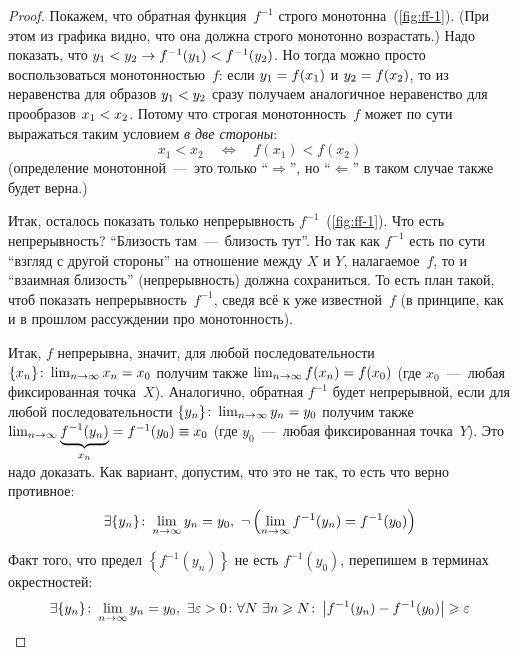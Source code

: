 \documentclass[a4paper,12pt]{article}
\begin{document}
\begin{proof}
    Покажем, что обратная функция~$f^{-1}$ строго монотонна~(\ref{fig:ff-1}).
    (При этом из графика видно, что она должна строго монотонно возрастать.)
    Надо показать, что $y_1 \hm< y_2 \hm\to f^{-1}(y_1) \hm< f^{-1}(y_2)$.
    Но тогда можно просто воспользоваться монотонностью~$f$: если $y_1 \hm= f(x_1)$ и $y_2 \hm= f(x_2)$, то из неравенства для образов $y_1 \hm< y_2$ сразу получаем аналогичное неравенство для прообразов $x_1 \hm< x_2$.
    Потому что строгая монотонность~$f$ может по сути выражаться таким условием \emph{в две стороны}:
    \[
      x_1 < x_2 \quad\Leftrightarrow\quad f(x_1) < f(x_2)
    \]
    (определение монотонной~---~это только ``$\Rightarrow$'', но ``$\Leftarrow$'' в таком случае также будет верна.)
    
    Итак, осталось показать только непрерывность $f^{-1}$~(\ref{fig:ff-1}).
    Что есть непрерывность?
    ``Близость там~---~близость тут''.
    Но так как $f^{-1}$ есть по сути ``взгляд с другой стороны'' на отношение между $X$ и $Y$, налагаемое~$f$, то и ``взаимная близость'' (непрерывность) должна сохраниться.
    То есть план такой, чтоб показать непрерывность~$f^{-1}$, сведя всё к уже известной~$f$ (в принципе, как и в прошлом рассуждении про монотонность).
    
    Итак, $f$ непрерывна, значит, для любой последовательности $\{x_n\}\colon \lim_{n \to\infty} x_n \hm= x_0$ получим также $\lim_{n\to \infty} f(x_n) \hm= f(x_0)$ (где $x_0$~---~любая фиксированная точка~$X$).
    Аналогично, обратная $f^{-1}$ будет непрерывной, если для любой последовательности $\{y_n\}\colon \lim_{n \to\infty} y_n \hm= y_0$ получим также $\lim_{n\to \infty} \underbrace{f^{-1}(y_n)}_{x_n} \hm= f^{-1}(y_0) \hm\equiv x_0$ (где $y_0$~---~любая фиксированная точка~$Y$).
    Это надо доказать.
    Как вариант, допустим, что это не так, то есть что верно противное:
    \[
      \exists \{y_n\}\colon \lim_{n \to\infty} y_n \hm= y_0,\ \neg \left(\lim_{n\to \infty} f^{-1}(y_n) \hm= f^{-1}(y_0)\right)
    \]
    
    Факт того, что предел $\left\{f^{-1}(y_n)\right\}$ не есть $f^{-1}(y_0)$, перепишем в терминах окрестностей:
    \[
      \exists \{y_n\}\colon \lim_{n \to\infty} y_n \hm= y_0,\
        \exists \eps > 0\colon \forall N\ \exists n \geq N\colon \left|f^{-1}(y_n) - f^{-1}(y_0)\right| \geq \eps
    \]
    

\end{proof}
\end{document}
